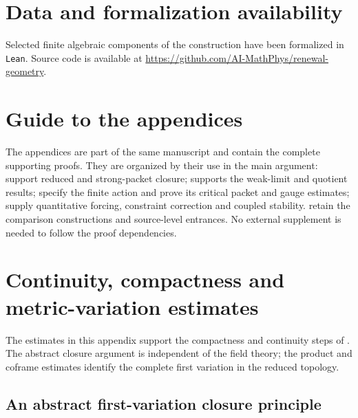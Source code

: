 \documentclass[11pt]{article}
\numberwithin{equation}{section}
\theoremstyle{definition}
\theoremstyle{remark}
\begin{document}
\section*{Data and formalization availability}
Selected finite algebraic components of the construction have been formalized in
\texttt{Lean}.  Source code is available at
\url{https://github.com/AI-MathPhys/renewal-geometry}.

\clearpage
\appendix
{}
\section*{Guide to the appendices}

The appendices are part of the same manuscript and contain the complete
supporting proofs. They are organized by their use in the main argument:
 support reduced and
strong-packet closure;  supports the weak-limit
and quotient results; 
specify the finite action and prove its critical packet and gauge estimates;
supply quantitative forcing, constraint correction and coupled stability.
retain the comparison constructions and source-level entrances. No external
supplement is needed to follow the proof dependencies.

\section{Continuity, compactness and metric-variation estimates}
\label{app:analytic-preliminaries}

The estimates in this appendix support the compactness and continuity
steps of . The abstract closure argument is
independent of the field theory; the product and coframe estimates identify
the complete first variation in the reduced topology.

\subsection{An abstract first-variation closure principle}
\end{document}
